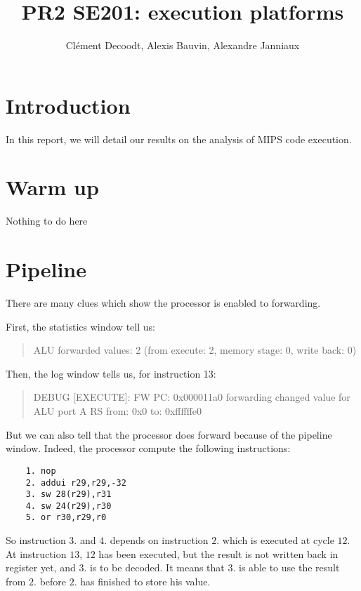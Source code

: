 \documentclass[a4paper]{report}
\author{Clément Decoodt, Alexis Bauvin, Alexandre Janniaux}
\title{PR2 SE201: execution platforms}
\begin{document}
\maketitle

\section{Introduction}

In this report, we will detail our results on the analysis of MIPS code execution.

\section{Warm up}

Nothing to do here

\section{Pipeline}

There are many clues which show the processor is enabled to forwarding.

First, the statistics window tell us:
\begin{quote}
    ALU forwarded values: 2 (from execute: 2, memory stage: 0, write back: 0)
\end{quote}

Then, the log window tells us, for instruction 13:
\begin{quote}
    DEBUG [EXECUTE]: {FW} PC: 0x000011a0 forwarding changed value for ALU port A RS from: 0x0 to: 0xffffffe0
\end{quote}

But we can also tell that the processor does forward because of the pipeline window. 
Indeed, the processor compute the following instructions:

\begin{verbatim}
    1. nop
    2. addui r29,r29,-32
    3. sw 28(r29),r31
    4. sw 24(r29),r30
    5. or r30,r29,r0
\end{verbatim}

So instruction $3.$ and $4.$  depends on instruction $2.$ which is executed at cycle $12$. 
At instruction $13$, $12$ has been executed, but the result is not written back in register yet, 
and $3.$ is to be decoded. It means that $3.$ is able to use the result from $2.$ before $2.$ has finished
to store his value.

\subsection{}
\end{document}
